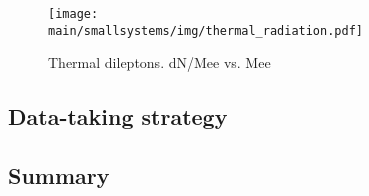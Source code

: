 \documentclass[../report.tex]{subfiles}
\providecommand{\main}{..}
\begin{document}
\begin{figure}[ht]
\centering
\texttt{[image: \\main/smallsystems/img/thermal\_radiation.pdf]}
\caption{Thermal dileptons. dN/Mee vs. Mee}
\label{fig:smallsystems_thermal_radition}
\end{figure}

\subsection{Data-taking strategy}


\subsection{Summary}
\end{document}
